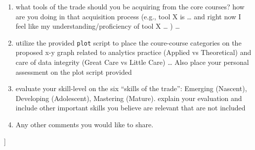 \documentclass[
]{article}
\begin{document}
\begin{enumerate}
\def\labelenumi{(\arabic{enumi})}
\setcounter{enumi}{1}
\item
  what tools of the trade should you be acquiring from the core courses?
  how are you doing in that acquisition process (e.g., tool X is
  \ldots{} and right now I feel like my understanding/proficiency of
  tool X \ldots{} ) \ldots{}
\item
  utilize the provided \texttt{plot} script to place the coure-course
  categories on the proposed x-y graph related to analytics practice
  (Applied vs Theoretical) and care of data integrity (Great Care vs
  Little Care) \ldots{} Also place your personal assessment on the plot
  script provided
\item
  evaluate your skill-level on the six ``skills of the trade'': Emerging
  (Nascent), Developing (Adolescent), Mastering (Mature). explain your
  evaluation and include other important skills you believe are relevant
  that are not included
\item
  Any other comments you would like to share.
\end{enumerate}

{]}
\end{document}
